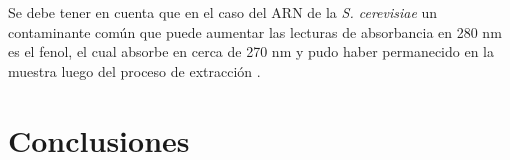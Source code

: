 \documentclass[fleqn,10pt]{SelfArx}
\begin{document}
	Se debe tener en cuenta que en el caso del ARN de la \textit{S. cerevisiae} un contaminante com\'un que puede aumentar las lecturas de absorbancia en 280 nm es el fenol, el cual absorbe en cerca de 270 nm y pudo haber permanecido en la muestra luego del proceso de extracci\'on \cite{toni2018optimization}.
\section{Conclusiones}
	



\end{document}
